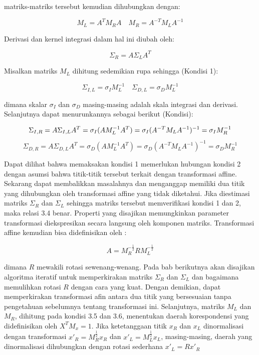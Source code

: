 matriks-matriks tersebut kemudian dihubungkan dengan:

\begin{equation}
  M_{L} = A^{T}M_{R}A \quad M_{R} = A^{-T}M_{L}A^{-1}
\end{equation}

Derivasi dan kernel integrasi dalam hal ini diubah oleh:

\begin{equation*}
  \Sigma_{R} = A\Sigma_{L}A^{T}
\end{equation*}

Misalkan matriks \(M_{L}\) dihitung sedemikian rupa sehingga (Kondisi 1):

\begin{equation}
  \Sigma_{I,L}=\sigma_{I}M_{L}^{-1} \quad \Sigma_{D,L}=\sigma_{D}M_{L}^{-1}
\end{equation}

dimana skalar \(\sigma_{I}\) dan \(\sigma_{D}\) masing-masing adalah skala integrasi dan derivasi. 
Selanjutnya dapat menurunkannya sebagai berikut (Kondisi):

\begin{equation*}
  \Sigma_{I,R} = A\Sigma_{I,L}A^{T} = \sigma_{I}(AM_{L}^{-1}A^{T}) = \sigma_{I}(A^{-T}M_{L}A^{-1})^{-1} = \sigma_{I}M_{R}^{-1} \\
\end{equation*}
\begin{equation}
  \Sigma_{D,R} = A\Sigma_{D,L}A^{T} = \sigma_{D}(AM_{L}^{-1}A^{T}) = \sigma_{D}(A^{-T}M_{L}A^{-1})^{-1} = \sigma_{D}M_{R}^{-1}
\end{equation}


Dapat dilihat bahwa memaksakan kondisi 1 memerlukan hubungan kondisi 2 dengan asumsi bahwa 
titik-titik tersebut terkait dengan transformasi affine. Sekarang dapat membalikkan masalahnya dan 
menganggap memiliki dua titik yang dihubungkan oleh transformasi affine yang tidak diketahui. 
Jika diestimasi matriks \(\Sigma_{R}\) dan \(\Sigma_{L}\) sehingga matriks tersebut memverifikasi 
kondisi 1 dan 2, maka relasi 3.4 benar. Properti yang disajikan memungkinkan parameter transformasi 
diekspresikan secara langsung oleh komponen matriks. Transformasi affine kemudian bisa didefinisikan oleh :

\begin{equation*}
  A = M_{R}^{-\frac{1}{2}}R M_{L}^{-\frac{1}{2}}
\end{equation*}

dimana \(R\) mewakili rotasi sewenang-wenang. Pada bab berikutnya akan disajikan algoritma iteratif untuk memperkirakan matriks \(\Sigma_{R}\) dan \(\Sigma_{L}\) dan 
bagaimana memulihkan rotasi \(R\) dengan cara yang kuat. Dengan demikian, dapat memperkirakan transformasi afin antara dua titik yang bersesuaian 
tanpa pengetahuan sebelumnya tentang transformasi ini. Selanjutnya, matriks \(M_{L}\) dan \(M_{R}\), dihitung pada kondisi 3.5 dan 3.6, menentukan daerah korespondensi 
yang didefinisikan oleh \(X^{T}M_{x}=1\). Jika ketetanggaan titik \(x_{R}\) dan \(x_{L}\) dinormalisasi dengan transformasi \(x'_{R}=M^{\frac{1}{2}}_{R}x_{R}\) dan \(x'_{L}=M^{\frac{1}{2}}_{L}x_{L}\), masing-masing, 
daerah yang dinormalisasi dihubungkan dengan rotasi sederhana \(x'_{L}=Rx'_{R}\)


